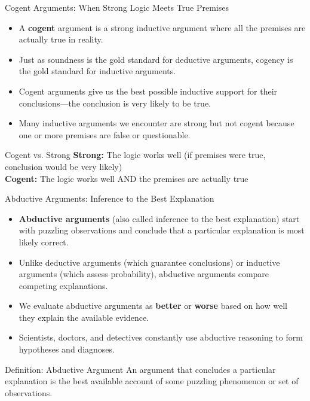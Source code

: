 \documentclass{beamer}
\begin{document}
\begin{frame}{Cogent Arguments: When Strong Logic Meets True Premises}
	\begin{itemize}
		\item A \textbf{cogent} argument is a strong inductive argument where all the premises are actually true in reality.
		\item Just as soundness is the gold standard for deductive arguments, cogency is the gold standard for inductive arguments.
		\item Cogent arguments give us the best possible inductive support for their conclusions—the conclusion is very likely to be true.
		\item Many inductive arguments we encounter are strong but not cogent because one or more premises are false or questionable.
	\end{itemize}
	
	\begin{alertblock}{Cogent vs. Strong}
		\textbf{Strong:} The logic works well (if premises were true, conclusion would be very likely)
		\\[0.5em]
		\textbf{Cogent:} The logic works well AND the premises are actually true
	\end{alertblock}
\end{frame}

\begin{frame}{Abductive Arguments: Inference to the Best Explanation}
	\begin{itemize}
		\item \textbf{Abductive arguments} (also called inference to the best explanation) start with puzzling observations and conclude that a particular explanation is most likely correct.
		\item Unlike deductive arguments (which guarantee conclusions) or inductive arguments (which assess probability), abductive arguments compare competing explanations.
		\item We evaluate abductive arguments as \textbf{better} or \textbf{worse} based on how well they explain the available evidence.
		\item Scientists, doctors, and detectives constantly use abductive reasoning to form hypotheses and diagnoses.
	\end{itemize}
	
	\begin{block}{Definition: Abductive Argument}
		An argument that concludes a particular explanation is the best available account of some puzzling phenomenon or set of observations.
	\end{block}
\end{frame}
\end{document}
